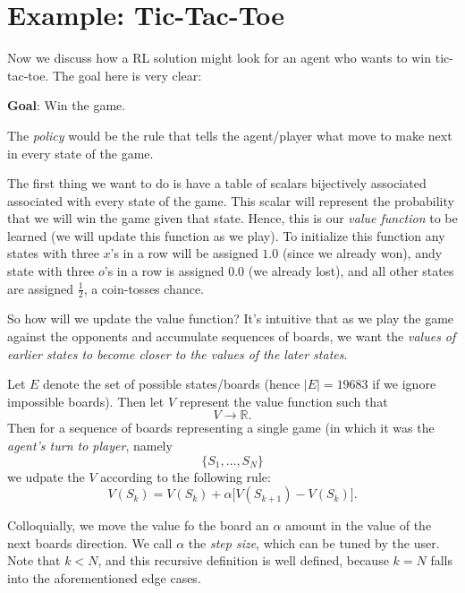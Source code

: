 \documentclass[11pt]{article}
\theoremstyle{definition}
\begin{document}
\section*{\textcolor{CalPolyGreen}{Example: Tic-Tac-Toe}}

Now we discuss how a RL solution might look for an agent who wants to win tic-tac-toe. The goal here is very clear:

\textbf{Goal}: Win the game.

The \textit{policy} would be the rule that tells the agent/player what move to make next in every state of the game.

The first thing we want to do is have a table of scalars bijectively associated associated with every state of the game.  This scalar will represent the probability that we will win the game given that state.  Hence, this is our \textit{value function} to be learned (we will update this function as we play).  To initialize this function any states with three $x$'s in a row will be assigned $1.0$ (since we already won), andy state with three $o$'s in a row is assigned $0.0$ (we already lost), and all other states are assigned $\frac{1}{2}$, a coin-tosses chance.

So how will we update the value function?  It's intuitive that as we play the game against the opponents and accumulate sequences of boards, we want the \textit{values of earlier states to become closer to the values of the later states}.

Let $E$ denote the set of possible states/boards (hence $|E| = 19683$ if we ignore impossible boards).  Then let $V$ represent the value function such that
\[
    V\to\mathbb{R}.
\]
Then for a sequence of boards representing a single game (in which it was the \textit{agent's turn to player}, namely
\[
    \big\{ S_1, \dots, S_N \big\}
\]
we udpate the $V$ according to the following rule:
\[
    V(S_k) = V(S_k) + \alpha \big[V(S_{k+1}) - V(S_k) \big].
\]

Colloquially, we move the value fo the board an $\alpha$ amount in the value of the next boards direction.  We call $\alpha$ the \textit{step size}, which can be tuned by the user.  Note that $k < N$, and this recursive definition is well defined, because $k = N$ falls into the aforementioned edge cases.
\end{document}

